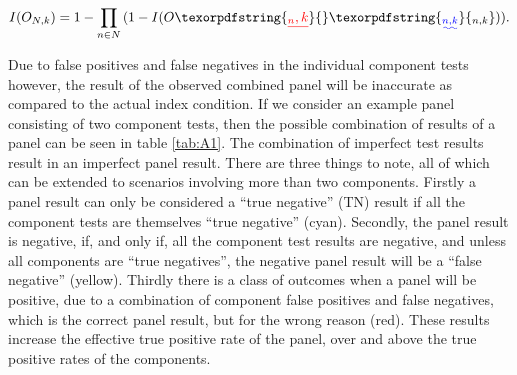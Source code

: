 \documentclass[a4paper, 12pt, twoside]{article}
\providecommand{\DIFaddtex}[1]{{\protect\color{blue}\uwave{#1}}} %
\providecommand{\DIFdeltex}[1]{{\protect\color{red}\sout{#1}}}                      %
\providecommand{\DIFaddbegin}{} %
\providecommand{\DIFaddend}{} %
\providecommand{\DIFdelbegin}{} %
\providecommand{\DIFdelend}{} %
\providecommand{\DIFadd}[1]{\texorpdfstring{\DIFaddtex{#1}}{#1}} %
\providecommand{\DIFdel}[1]{\texorpdfstring{\DIFdeltex{#1}}{}} %
\begin{document}
\begin{equation*}
\begin{aligned}
I(O_{N,k}) = 1-\prod_{n \in N}{(1-I(O\DIFdelbegin \DIFdel{_n,k}\DIFdelend \DIFaddbegin \DIFadd{_{n,k}}\DIFaddend ))}. \\
\end{aligned}
\end{equation*}

Due to false positives and false negatives in the individual component tests however, the result of the observed combined panel will be inaccurate as compared to the actual index condition. If we consider an example panel consisting of two component tests, then the possible combination of results of a panel can be seen in table \ref{tab:A1}. The combination of imperfect test results result in an imperfect panel result. There are three things to note, all of which can be extended to scenarios involving more than two components. Firstly a panel result can only be considered a ``true negative'' (TN) result if all the component tests are themselves ``true negative'' (cyan). Secondly, the panel result is negative, if, and only if, all the component test results are negative, and unless all components are ``true negatives'', the negative panel result will be a ``false negative'' (yellow). Thirdly there is a class of outcomes when a panel will be positive, due to a combination of component false positives and false negatives, which is the correct panel result, but for the wrong reason (red). These results increase the effective true positive rate of the panel, over and above the true positive rates of the components.
\end{document}
